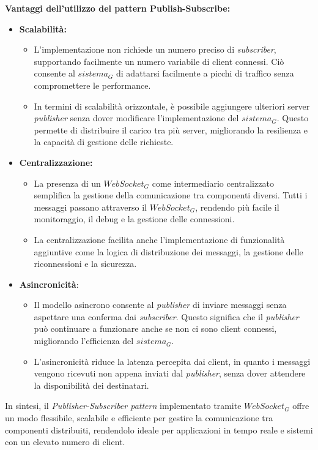 \newpage
\textbf{Vantaggi dell'utilizzo del pattern Publish-Subscribe:}
\begin{itemize}
\item \textbf{Scalabilità:}
\begin{itemize}
\item L'implementazione non richiede un numero preciso di \textit{subscriber}, supportando facilmente un numero variabile di client connessi. Ciò consente al $\textit{sistema}_G$ di adattarsi facilmente a picchi di traffico senza compromettere le performance.
\item In termini di scalabilità orizzontale, è possibile aggiungere ulteriori server \textit{publisher} senza dover modificare l'implementazione del $\textit{sistema}_G$. Questo permette di distribuire il carico tra più server, migliorando la resilienza e la capacità di gestione delle richieste.
\end{itemize}
\item \textbf{Centralizzazione:}
\begin{itemize}
\item La presenza di un $\textit{WebSocket}_G$ come intermediario centralizzato semplifica la gestione della comunicazione tra componenti diversi. Tutti i messaggi passano attraverso il $\textit{WebSocket}_G$, rendendo più facile il monitoraggio, il debug e la gestione delle connessioni.
\item La centralizzazione facilita anche l'implementazione di funzionalità aggiuntive come la logica di distribuzione dei messaggi, la gestione delle riconnessioni e la sicurezza.
\end{itemize}
\item \textbf{Asincronicità}:
\begin{itemize}
\item Il modello asincrono consente al \textit{publisher} di inviare messaggi senza aspettare una conferma dai \textit{subscriber}. Questo significa che il \textit{publisher} può continuare a funzionare anche se non ci sono client connessi, migliorando l'efficienza del $\textit{sistema}_G$.
\item L'asincronicità riduce la latenza percepita dai client, in quanto i messaggi vengono ricevuti non appena inviati dal \textit{publisher}, senza dover attendere la disponibilità dei destinatari.
\end{itemize}
\end{itemize}

In sintesi, il \textit{Publisher-Subscriber pattern} implementato tramite $\textit{WebSocket}_G$ offre un modo flessibile, scalabile e efficiente per gestire la comunicazione tra componenti distribuiti, rendendolo ideale per applicazioni in tempo reale e sistemi con un elevato numero di client.
\newpage
